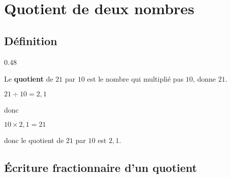 \documentclass[a4paper,dvipsnames]{article}
\begin{document}

\section{Quotient de deux nombres}

\subsection{Définition}

{0.48\linewidth}{\begin{Ex}
Le \textbf{quotient} de $21$ par $10$ est le nombre qui multiplié pas $10$, donne $21$.
\begin{center}
$21\div10=2,1$

donc

$10\times2,1=21$
\end{center}

donc le quotient de $21$ par $10$ est $2,1$.
\end{Ex}}

\subsection{Écriture fractionnaire d'un quotient}
\end{document}
